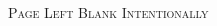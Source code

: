 \documentclass[11pt, a4paper]{article}
\begin{document}
\clearpage
\thispagestyle{empty}
\hspace{0cm}
\vfill
\begin{center}
{\color{gray}\huge{\textsc{Page Left Blank Intentionally}}}
\end{center}
\vfill
\hspace{0cm}
\clearpage
{}

\setcounter{page}{0}

\begin{multicols}{2}

\footnotesize{


\columnbreak

\listoftables

\listoffigures

}

\end{multicols}

\clearpage



\clearpage
\end{document}
